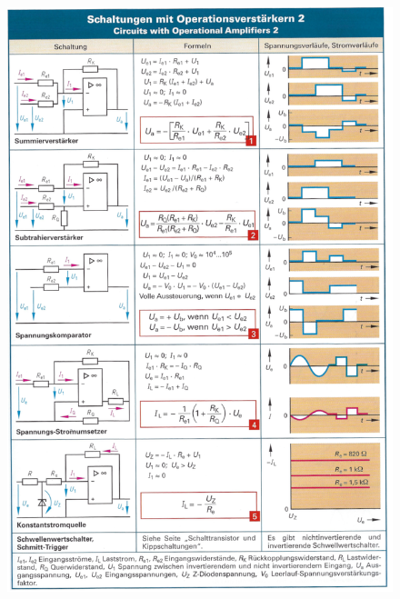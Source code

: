 \documentclass[a5paper, 12pt]{scrartcl}
\begin{document}
\clearpage
\begin{figure}[H]
  \centering \includegraphics[width=.9\textwidth]{OPV2}
\end{figure}
\clearpage
\end{document}
